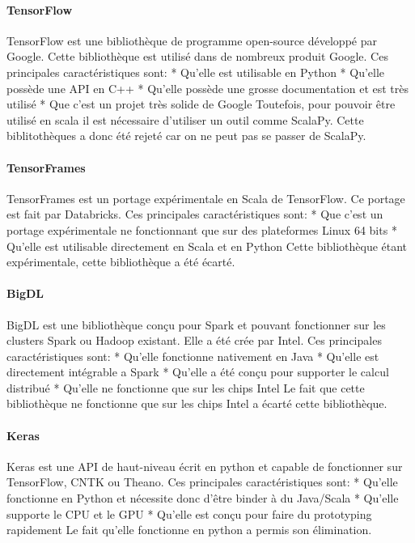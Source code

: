 \documentclass[a4paper,10pt,openany,oneside]{sphinxmanual}
\begin{document}
\paragraph{TensorFlow}
\label{index:tensorflow}
TensorFlow est une bibliothèque de programme open-source développé par Google. Cette bibliothèque est utilisé dans de nombreux produit Google.
Ces principales caractéristiques sont:
* Qu'elle est utilisable en Python
* Qu'elle possède une API en C++
* Qu'elle possède une grosse documentation et est très utilisé
* Que c'est un projet très solide de Google
Toutefois, pour pouvoir être utilisé en scala il est nécessaire d'utiliser un outil comme ScalaPy. Cette biblitothèques a donc été rejeté
car on ne peut pas se passer de ScalaPy.


\paragraph{TensorFrames}
\label{index:tensorframes}
TensorFrames est un portage expérimentale en Scala de TensorFlow. Ce portage est fait par Databricks. Ces principales caractéristiques sont:
* Que c'est un portage expérimentale ne fonctionnant que sur des plateformes Linux 64 bits
* Qu'elle est utilisable directement en Scala et en Python
Cette bibliothèque étant expérimentale, cette bibliothèque a été écarté.


\paragraph{BigDL}
\label{index:bigdl}
BigDL est une bibliothèque conçu pour Spark et pouvant fonctionner sur les clusters Spark ou Hadoop existant. Elle a été crée par Intel.
Ces principales caractéristiques sont:
* Qu'elle fonctionne nativement en Java
* Qu'elle est directement intégrable a Spark
* Qu'elle a été conçu pour supporter le calcul distribué
* Qu'elle ne fonctionne que sur les chips Intel
Le fait que cette bibliothèque ne fonctionne que sur les chips Intel a écarté cette bibliothèque.


\paragraph{Keras}
\label{index:keras}
Keras est une API de haut-niveau écrit en python et capable de fonctionner sur TensorFlow, CNTK ou Theano. Ces principales caractéristiques sont:
* Qu'elle fonctionne en Python et nécessite donc d'être binder à du Java/Scala
* Qu'elle supporte le CPU et le GPU
* Qu'elle est conçu pour faire du prototyping rapidement
Le fait qu'elle fonctionne en python a permis son élimination.
\end{document}
